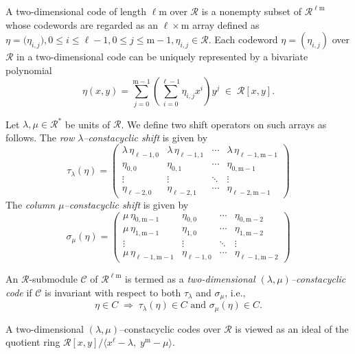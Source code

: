 \documentclass[12pt,a4paper]{article}
\begin{document}
\medskip
A two-dimensional code of length $\ell\mathrm{m}$ over $\mathcal{R}$ is a nonempty subset of $\mathcal{R}^{\ell\mathrm{m}}$ whose codewords are regarded as an $\ell\times \mathrm{m}$ array defined as $\eta=\big(\eta_{i,j}\big),0\le i\le \ell-1,0\le j\le \mathrm{m}-1,\eta_{i,j}\in \mathcal{R}$. Each codeword $\eta=(\eta_{i,j})$ over $\mathcal{R}$ in a two-dimensional code can be uniquely represented by a bivariate polynomial
\[
\eta(x,y)=\sum_{j=0}^{\mathrm{m}-1}\left(\sum_{i=0}^{\ell-1} \eta_{i,j}x^{i}\right)y^{j}
\;\in\; \mathcal{R}[x,y].
\]

Let $\lambda,\mu\in \mathcal{R}^*$ be units of $\mathcal{R}$. We define two shift operators on such arrays as follows. The \emph{row $\lambda$–constacyclic shift} is given by 
\[
\tau_{\lambda}(\eta) =
\begin{pmatrix}
\lambda\,\eta_{\ell-1,0} & \lambda\,\eta_{\ell-1,1} & \cdots & \lambda\,\eta_{\ell-1,\mathrm{m}-1} \\
\eta_{0,0} & \eta_{0,1} & \cdots & \eta_{0,\mathrm{m}-1} \\
\vdots & \vdots & \ddots & \vdots \\
\eta_{\ell-2,0} & \eta_{\ell-2,1} & \cdots & \eta_{\ell-2,\mathrm{m}-1}
\end{pmatrix}
\]
The \emph{column $\mu$–constacyclic shift} is given by
\[
\sigma_{\mu}(\eta) =
\begin{pmatrix}
\mu\,\eta_{0,\mathrm{m}-1} & \eta_{0,0} & \cdots & \eta_{0,\mathrm{m}-2} \\
\mu\,\eta_{1,\mathrm{m}-1} & \eta_{1,0} & \cdots & \eta_{1,\mathrm{m}-2} \\
\vdots & \vdots & \ddots & \vdots \\
\mu\,\eta_{\ell-1,\mathrm{m}-1} & \eta_{\ell-1,0} & \cdots & \eta_{\ell-1,\mathrm{m}-2}
\end{pmatrix}
\]


An $\mathcal{R}$-submodule  $\mathcal{C}$ of $\mathcal{R}^{\ell\mathrm{m}}$ is termed as a \emph{two-dimensional $(\lambda,\mu)$–constacyclic code}
if $\mathcal{C}$ is invariant with respect to both $\tau_{\lambda}$ and $\sigma_{\mu}$, i.e.,
\[
\eta\in C \;\Longrightarrow\; \tau_{\lambda}(\eta)\in C \text{ and } \sigma_{\mu}(\eta)\in C.
\]

A two-dimensional $(\lambda,\mu)$–constacyclic codes over $\mathcal{R}$ is viewed as an ideal of the quotient ring $\mathcal{R}[x,y]\big/\langle x^{\ell}-\lambda,\; y^{\mathrm{m}}-\mu\rangle$. 
\end{document}
